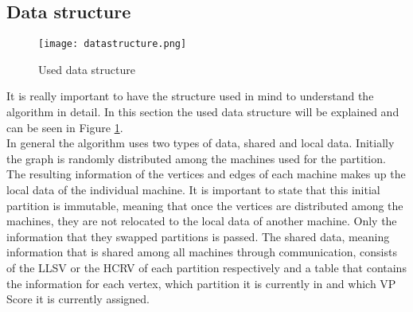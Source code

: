 \documentclass[acmsmall,nonacm,screen,review]{acmart}
\begin{document}
\subsection{Data structure}
\begin{figure}[bt!]
\caption{Used data structure}
\label{datastructure}
\texttt{[image: datastructure.png]}
\end{figure}
It is really important to have the structure used in mind to understand the algorithm in detail. In this section the used data structure will be explained and can be seen in Figure \ref{datastructure}.\\
In general the algorithm uses two types of data, shared and local data. Initially the graph is randomly distributed among the machines used for the partition. The resulting information of the vertices and edges of each machine makes up the local data of the individual machine. It is important to state that this initial partition is immutable, meaning that once the vertices are distributed among the machines, they are not relocated to the local data of another machine. Only the information that they swapped partitions is passed. The shared data, meaning information that is shared among all machines through communication, consists of the LLSV or the HCRV of each partition respectively and a table that contains the information for each vertex, which partition it is currently in and which VP Score it is currently assigned.
\end{document}
